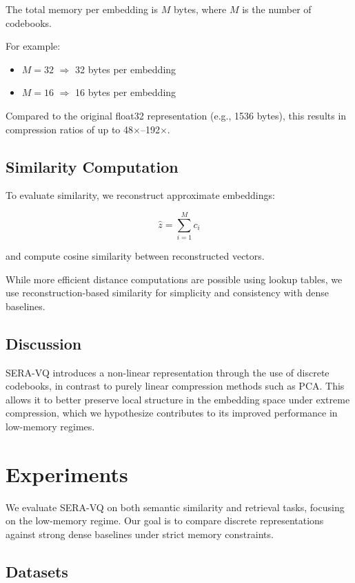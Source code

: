 \documentclass{article}
\begin{document}
The total memory per embedding is $M$ bytes, where $M$ is the number of codebooks.

For example:

\begin{itemize}
    \item $M = 32$ $\Rightarrow$ 32 bytes per embedding
    \item $M = 16$ $\Rightarrow$ 16 bytes per embedding
\end{itemize}

Compared to the original float32 representation (e.g., 1536 bytes), this results in compression ratios of up to 48$\times$--192$\times$.

\subsection{Similarity Computation}

To evaluate similarity, we reconstruct approximate embeddings:

\[
\hat{z} = \sum_{i=1}^{M} c_i
\]

and compute cosine similarity between reconstructed vectors.

While more efficient distance computations are possible using lookup tables, we use reconstruction-based similarity for simplicity and consistency with dense baselines.

\subsection{Discussion}

SERA-VQ introduces a non-linear representation through the use of discrete codebooks, in contrast to purely linear compression methods such as PCA. This allows it to better preserve local structure in the embedding space under extreme compression, which we hypothesize contributes to its improved performance in low-memory regimes.

\section{Experiments}

We evaluate SERA-VQ on both semantic similarity and retrieval tasks, focusing on the low-memory regime. Our goal is to compare discrete representations against strong dense baselines under strict memory constraints.

\subsection{Datasets}
\end{document}
